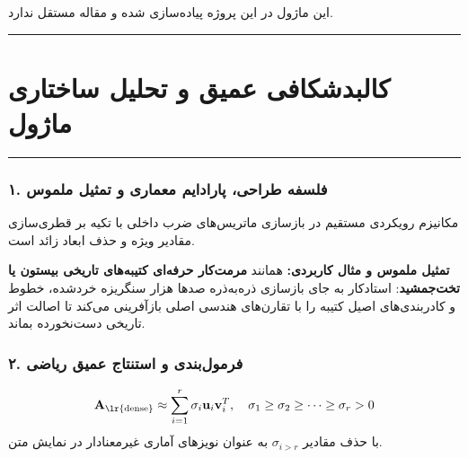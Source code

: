 \clearpage
{}
\vspace*{0.2cm}

این ماژول در این پروژه پیاده‌سازی شده و مقاله مستقل ندارد.
\noindent\rule{\textwidth}{1.2pt}
\vspace*{0.1cm}
\section{کالبدشکافی عمیق و تحلیل ساختاری ماژول }
\label{sec:mod_svd_projection_attention}
\vspace*{-0.2cm}
\noindent\rule{\textwidth}{0.5pt}
\vspace*{0.3cm}

\subsubsection*{۱. فلسفه طراحی، پارادایم معماری و تمثیل ملموس}
مکانیزم  رویکردی مستقیم در بازسازی ماتریس‌های ضرب داخلی با تکیه بر قطری‌سازی مقادیر ویژه و حذف ابعاد زائد است.

\textbf{تمثیل ملموس و مثال کاربردی:}
همانند \textbf{مرمت‌کار حرفه‌ای کتیبه‌های تاریخی بیستون یا تخت‌جمشید}: استادکار به جای بازسازی ذره‌به‌ذره صدها هزار سنگریزه خردشده، خطوط و کادربندی‌های اصیل کتیبه را با تقارن‌های هندسی اصلی بازآفرینی می‌کند تا اصالت اثر تاریخی دست‌نخورده بماند.

\subsubsection*{۲. فرمول‌بندی و استنتاج عمیق ریاضی }
\begin{equation}
\mathbf{A}_{\text{\lr{dense}}} \approx \sum_{i=1}^r \sigma_i \mathbf{u}_i \mathbf{v}_i^T, \quad \sigma_1 \ge \sigma_2 \ge \dots \ge \sigma_r > 0
\end{equation}
با حذف مقادیر $\sigma_{i>r}$ به عنوان نویزهای آماری غیرمعنادار در نمایش متن.

